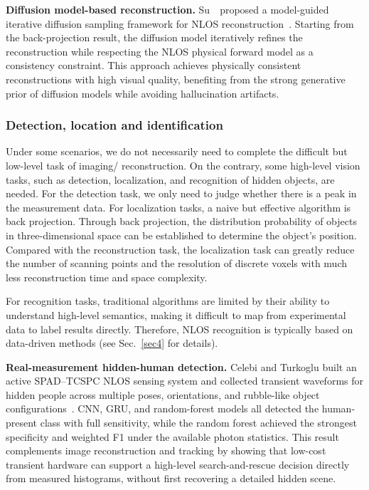 \vspace{0.8mm}
\noindent \textbf{Diffusion model-based reconstruction.}
Su~\etal~proposed a model-guided iterative diffusion sampling framework for NLOS reconstruction~\cite{suModelGuidedDiffusion2024}. Starting from the back-projection result, the diffusion model iteratively refines the reconstruction while respecting the NLOS physical forward model as a consistency constraint. This approach achieves physically consistent reconstructions with high visual quality, benefiting from the strong generative prior of diffusion models while avoiding hallucination artifacts.

\subsubsection{Detection, location and identification}
Under some scenarios, we do not necessarily need to complete the difficult but low-level task of imaging/ reconstruction. On the contrary, some  high-level vision tasks, such as detection, localization, and recognition of hidden objects, are needed. For the detection task, we only need to judge whether there is a peak in the measurement data. 
For localization tasks, a naive but effective algorithm is back projection\cite{chanNonlineofsightTrackingPeople2017a,gariepyDetectionTrackingMoving2016}. Through back projection, the distribution probability of objects in three-dimensional space can be established to determine the object's position. Compared with the reconstruction task, the localization task can greatly reduce the number of scanning points and the resolution of discrete voxels with much less reconstruction time and space complexity. 

For recognition tasks, traditional algorithms are limited by their ability to understand high-level semantics, making it difficult to map from experimental data to label results directly.
Therefore, NLOS recognition is typically  based on data-driven methods (see Sec.~\ref{sec4} for details).

\vspace{0.8mm}
\noindent \textbf{Real-measurement hidden-human detection.}
Celebi and Turkoglu built an active SPAD--TCSPC NLOS sensing system and collected transient waveforms for hidden people across multiple poses, orientations, and rubble-like object configurations~\cite{celebiHumanDetectionNLOS2026}. CNN, GRU, and random-forest models all detected the human-present class with full sensitivity, while the random forest achieved the strongest specificity and weighted F1 under the available photon statistics. This result complements image reconstruction and tracking by showing that low-cost transient hardware can support a high-level search-and-rescue decision directly from measured histograms, without first recovering a detailed hidden scene.


